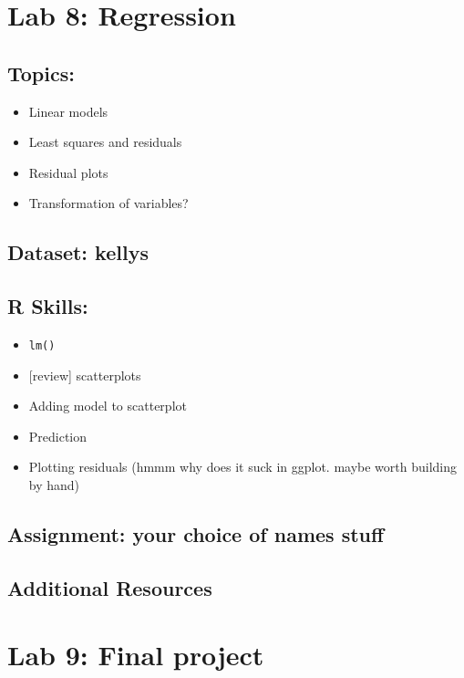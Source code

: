 \documentclass[]{article}
\providecommand{\tightlist}{%
  \setlength{\itemsep}{0pt}\setlength{\parskip}{0pt}}
\begin{document}
\section{Lab 8: Regression}\label{lab-8-regression}

\subsection{Topics:}\label{topics-7}

\begin{itemize}
\tightlist
\item
  Linear models
\item
  Least squares and residuals
\item
  Residual plots
\item
  Transformation of variables?
\end{itemize}

\subsection{Dataset: kellys}\label{dataset-kellys}

\subsection{R Skills:}\label{r-skills-6}

\begin{itemize}
\tightlist
\item
  \texttt{lm()}
\item
  {[}review{]} scatterplots
\item
  Adding model to scatterplot
\item
  Prediction
\item
  Plotting residuals (hmmm why does it suck in ggplot. maybe worth
  building by hand)
\end{itemize}

\subsection{Assignment: your choice of names
stuff}\label{assignment-your-choice-of-names-stuff}

\subsection{Additional Resources}\label{additional-resources-6}

\section{Lab 9: Final project}\label{lab-9-final-project}
\end{document}
